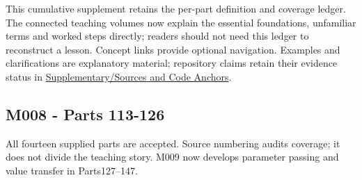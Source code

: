 This cumulative supplement retains the per-part definition and coverage ledger. The connected teaching volumes now explain the essential foundations, unfamiliar terms and worked steps directly; readers should not need this ledger to reconstruct a lesson. Concept links provide optional navigation. Examples and clarifications are explanatory material; repository claims retain their evidence status in \hyperref[appendix-a103e7846d21]{Supplementary/Sources and Code Anchors}.

\subsection{M008 - Parts 113-126}\label{appendix-fd090d982a15-m008---parts-113-126}

All fourteen supplied parts are accepted. Source numbering audits coverage; it does not divide the teaching story. M009 now develops parameter passing and value transfer in Parts127--147.

